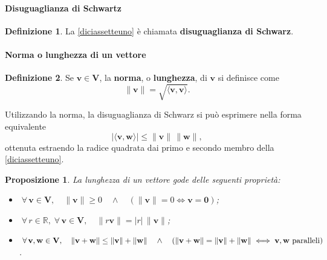 \documentclass{article}
\theoremstyle{plain}
\newtheorem{prop}[thm]{Proposizione}
\theoremstyle{definition}
\newtheorem{defn}{Definizione}[section]
\theoremstyle{remark}
\begin{document}
\vspace{10pt}

\paragraph{Disuguaglianza di Schwartz}
\begin{bxthm}
\begin{defn}
La \ref{diciassetteuno} è chiamata \textbf{disuguaglianza di Schwarz}.    
\end{defn}
\end{bxthm}

\vspace{10pt}

\paragraph{Norma o lunghezza di un vettore}
\begin{bxthm}
\begin{defn}
Se $\mathbf{v} \in \mathbf{V}$, la \textbf{norma}, o \textbf{lunghezza}, di $\mathbf{v}$ si definisce come
\[
\| \mathbf{v} \| = \sqrt{\langle \mathbf{v}, \mathbf{v} \rangle}.
\]    
\end{defn}
\end{bxthm}

\vspace{10pt}

Utilizzando la norma, la disuguaglianza di Schwarz si può esprimere nella forma equivalente
\begin{equation}\label{diciassettedue}
    |\langle \mathbf{v}, \mathbf{w} \rangle| \leq \|\mathbf{v}\| \, \|\mathbf{w}\|,
\end{equation}
ottenuta estraendo la radice quadrata dai primo e secondo membro della \ref{diciassetteuno}.

\vspace{10pt}

\begin{bxthm}
\begin{prop}
La lunghezza di un vettore gode delle seguenti proprietà:
\begin{itemize}
    \item[N1] $\;\forall\,\mathbf{v} \in \mathbf{V},\quad \|\mathbf{v}\| \geq 0\quad\land\quad (\|\mathbf{v}\| = 0\iff \mathbf{v} = \mathbf{0})$;
    \item[N2] $\;\forall\,r \in \mathbb{R},\;\forall\,\mathbf{v} \in \mathbf{V},\quad\|r \mathbf{v}\| = |r| \, \|\mathbf{v}\|$;
    \item[N3] $\;\forall\,\mathbf{v}, \mathbf{w} \in \mathbf{V},\quad\|\mathbf{v} + \mathbf{w}\| \leq \|\mathbf{v}\| + \|\mathbf{w}\|\quad\land\quad (\|\mathbf{v} + \mathbf{w}\| = \|\mathbf{v}\| + \|\mathbf{w}\|\iff \mathbf{v},\mathbf{w}\textup{ paralleli})$.
\end{itemize}
\end{prop}
\end{bxthm}
\end{document}
